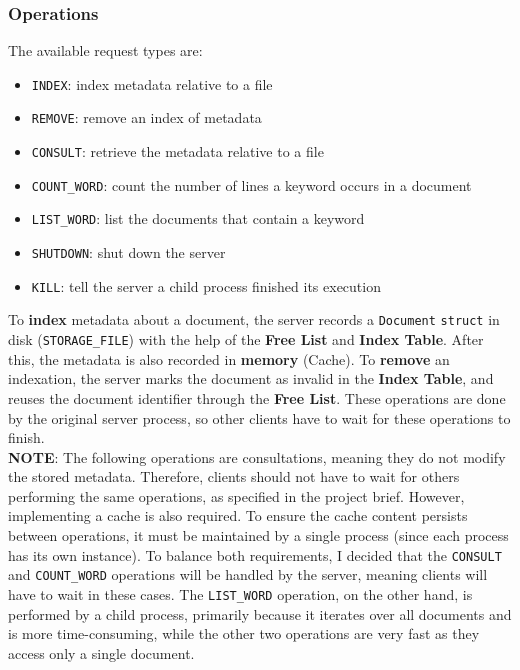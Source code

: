 \documentclass[a4paper, 11pt]{article}
\begin{document}
\subsubsection{Operations}

The available request types are:

\begin{itemize}
    \item \texttt{INDEX}: index metadata relative to a file
    \item \texttt{REMOVE}: remove an index of metadata
    \item \texttt{CONSULT}: retrieve the metadata relative to a file
    \item \texttt{COUNT\_WORD}: count the number of lines a keyword occurs in a document
    \item \texttt{LIST\_WORD}: list the documents that contain a keyword
    \item \texttt{SHUTDOWN}: shut down the server
    \item \texttt{KILL}: tell the server a child process finished its execution
\end{itemize}

\noindent To \textbf{index} metadata about a document, the server records a \texttt{Document} \texttt{struct} in disk (\texttt{STORAGE\_FILE}) with the help of the \textbf{Free List} and \textbf{Index Table}. After this, the metadata is also recorded in \textbf{memory} (Cache). To \textbf{remove} an indexation, the server marks the document as invalid in the \textbf{Index Table}, and reuses the document identifier through the \textbf{Free List}. These operations are done by the original server process, so other clients have to wait for these operations to finish.\\

\noindent \textbf{NOTE}: The following operations are consultations, meaning they do not modify the stored metadata. Therefore, clients should not have to wait for others performing the same operations, as specified in the project brief. However, implementing a cache is also required. To ensure the cache content persists between operations, it must be maintained by a single process (since each process has its own instance). To balance both requirements, I decided that the \texttt{CONSULT} and \texttt{COUNT\_WORD} operations will be handled by the server, meaning clients will have to wait in these cases. The \texttt{LIST\_WORD} operation, on the other hand, is performed by a child process, primarily because it iterates over all documents and is more time-consuming, while the other two operations are very fast as they access only a single document.\\
\end{document}
